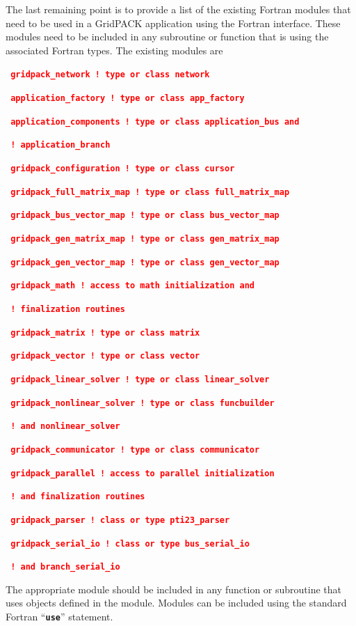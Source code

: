 \documentclass[12pt]{report} %
\begin{document}
The last remaining point is to provide a list of the existing Fortran modules that need to be used in a GridPACK application using the Fortran interface. These modules need to be included in any subroutine or function that is using the associated Fortran types. The existing modules are

\textcolor{red}{\texttt{\textbf{  gridpack\_network ! type or class network}}}

\textcolor{red}{\texttt{\textbf{  application\_factory ! type or class app\_factory}}}

\textcolor{red}{\texttt{\textbf{  application\_components ! type or class application\_bus and}}}

\textcolor{red}{\texttt{\textbf{                         ! application\_branch}}}

\textcolor{red}{\texttt{\textbf{  gridpack\_configuration ! type or class cursor}}}

\textcolor{red}{\texttt{\textbf{  gridpack\_full\_matrix\_map ! type or class full\_matrix\_map}}}

\textcolor{red}{\texttt{\textbf{  gridpack\_bus\_vector\_map ! type or class bus\_vector\_map}}}

\textcolor{red}{\texttt{\textbf{  gridpack\_gen\_matrix\_map ! type or class gen\_matrix\_map}}}

\textcolor{red}{\texttt{\textbf{  gridpack\_gen\_vector\_map ! type or class gen\_vector\_map}}}

\textcolor{red}{\texttt{\textbf{  gridpack\_math ! access to math initialization and}}}

\textcolor{red}{\texttt{\textbf{                ! finalization routines}}}

\textcolor{red}{\texttt{\textbf{  gridpack\_matrix ! type or class matrix}}}

\textcolor{red}{\texttt{\textbf{  gridpack\_vector ! type or class vector}}}

\textcolor{red}{\texttt{\textbf{  gridpack\_linear\_solver ! type or class linear\_solver}}}

\textcolor{red}{\texttt{\textbf{  gridpack\_nonlinear\_solver ! type or class funcbuilder}}}

\textcolor{red}{\texttt{\textbf{                            ! and nonlinear\_solver}}}

\textcolor{red}{\texttt{\textbf{  gridpack\_communicator ! type or class communicator}}}

\textcolor{red}{\texttt{\textbf{  gridpack\_parallel ! access to parallel initialization}}}

\textcolor{red}{\texttt{\textbf{                    ! and finalization routines}}}

\textcolor{red}{\texttt{\textbf{  gridpack\_parser ! class or type pti23\_parser}}}

\textcolor{red}{\texttt{\textbf{  gridpack\_serial\_io ! class or type bus\_serial\_io}}}

\textcolor{red}{\texttt{\textbf{                     ! and branch\_serial\_io}}}

The appropriate module should be included in any function or subroutine that uses objects defined in the module. Modules can be included using the standard Fortran ``\texttt{\textbf{use}}'' statement.
\end{document}
